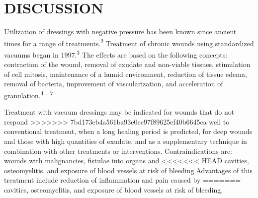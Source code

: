 \documentclass[numberinsection,times,10pt,spreadimages]{memoir}
\begin{document}
\section{DISCUSSION}

Utilization of dressings with negative pressure has been known since ancient
times for a range of treatments.\textsuperscript{2}
Treatment of chronic wounds using standardized vacuums
began in 1997.\textsuperscript{3}
The effects
are based on the following concepts: contraction of the wound, removal of
exudate and non-viable tissues, stimulation of cell mitosis, maintenance of a
humid environment, reduction of tissue edema, removal of bacteria, improvement
of vascularization, and acceleration of granulation.\textsuperscript{4}
\textsuperscript{-}
\textsuperscript{7}

Treatment with vacuum dressings may be indicated for wounds that do not respond
>>>>>>> 7bd173eb4a561ba93e0cc97f89625ef40b6645ca
well to conventional treatment, when a long healing period is predicted, for
deep wounds and those with high quantities of exudate, and as a supplementary
technique in combination with other treatments or interventions.
Contraindications are: wounds with malignancies, fistulae into organs and
<<<<<<< HEAD
cavities, osteomyelitis, and exposure of blood vessels at risk of
bleeding.Advantages of this treatment include reduction of inflammation and pain
caused by
=======
cavities, osteomyelitis, and exposure of blood vessels at risk of bleeding.
\end{document}
